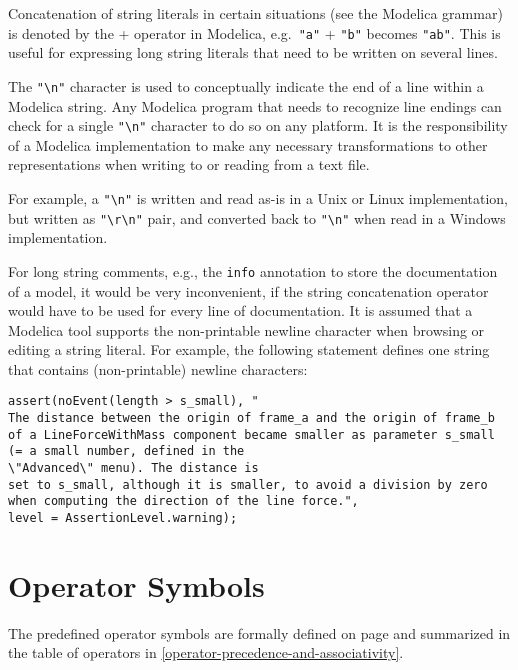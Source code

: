 Concatenation of string literals in certain situations (see the Modelica
grammar) is denoted by the + operator in Modelica, e.g.\ \lstinline!"a"! + \lstinline!"b"!
becomes \lstinline!"ab"!. This is useful for expressing long string literals that
need to be written on several lines.

The \lstinline!"\n"! character is used to conceptually indicate the
end of a line within a Modelica string. Any Modelica program that needs
to recognize line endings can check for a single \lstinline!"\n"!
character to do so on any platform. It is the responsibility of a
Modelica implementation to make any necessary transformations to other
representations when writing to or reading from a text file.

\begin{nonnormative}
For example, a \lstinline!"\n"! is written and read as-is in a Unix or Linux implementation, but written as
\lstinline!"\r\n"! pair, and converted back to \lstinline!"\n"! when read in a Windows implementation.
\end{nonnormative}

\begin{nonnormative}
For long string comments, e.g., the \lstinline!info! annotation to
store the documentation of a model, it would be very inconvenient, if
the string concatenation operator would have to be used for every line
of documentation. It is assumed that a Modelica tool supports the
non-printable newline character when browsing or editing a string
literal. For example, the following statement defines one string that
contains (non-printable) newline characters:
\begin{lstlisting}[language=modelica]
assert(noEvent(length > s_small), "
The distance between the origin of frame_a and the origin of frame_b
of a LineForceWithMass component became smaller as parameter s_small
(= a small number, defined in the
\"Advanced\" menu). The distance is
set to s_small, although it is smaller, to avoid a division by zero
when computing the direction of the line force.",
level = AssertionLevel.warning);
\end{lstlisting}
\end{nonnormative}

\section{Operator Symbols}\label{operator-symbols}

The predefined operator symbols are formally defined on page \pageref{lexical-conventions} and
summarized in the table of operators in \cref{operator-precedence-and-associativity}.
